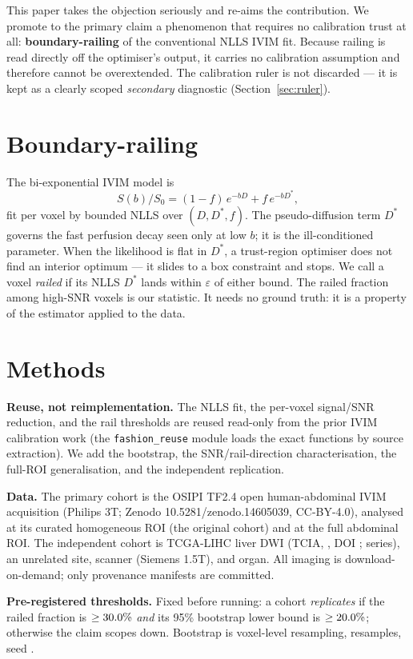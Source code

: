 \documentclass[11pt]{article}
\begin{document}
This paper takes the objection seriously and re-aims the contribution. We promote
to the primary claim a phenomenon that requires no calibration trust at all:
\textbf{boundary-railing} of the conventional NLLS IVIM fit. Because railing is
read directly off the optimiser's output, it carries no calibration assumption and
therefore cannot be overextended. The calibration ruler is not discarded --- it is
kept as a clearly scoped \emph{secondary} diagnostic (Section~\ref{sec:ruler}).

\section{Boundary-railing}
The bi-exponential IVIM model is
\[
S(b)/S_0 = (1-f)\,e^{-bD} + f\,e^{-bD^{*}},
\]
fit per voxel by bounded NLLS over $(D, D^{*}, f)$. The pseudo-diffusion term
$D^{*}$ governs the fast perfusion decay seen only at low $b$; it is the
ill-conditioned parameter. When the likelihood is flat in $D^{*}$, a
trust-region optimiser does not find an interior optimum --- it slides to a box
constraint and stops. We call a voxel \emph{railed} if its NLLS $D^{*}$ lands
within $\varepsilon$ of either bound. The railed fraction among high-SNR voxels is
our statistic. It needs no ground truth: it is a property of the estimator applied
to the data.

\section{Methods}
\textbf{Reuse, not reimplementation.} The NLLS fit, the per-voxel signal/SNR
reduction, and the rail thresholds are reused read-only from the prior IVIM
calibration work (the \texttt{fashion\_reuse} module loads the exact functions by
source extraction). We add the bootstrap, the SNR/rail-direction characterisation,
the full-ROI generalisation, and the independent replication.

\textbf{Data.} The primary cohort is the OSIPI TF2.4 open human-abdominal IVIM
acquisition (Philips 3T; Zenodo 10.5281/zenodo.14605039, CC-BY-4.0), analysed at
its curated homogeneous ROI (the original cohort) and at the full abdominal ROI.
The independent cohort is TCGA-LIHC liver DWI (TCIA, \lihcLicense, DOI
\lihcDOI{}; \lihcNseries{} series), an unrelated site, scanner (Siemens 1.5T), and
organ. All imaging is download-on-demand; only provenance manifests are committed.

\textbf{Pre-registered thresholds.} Fixed before running: a cohort
\emph{replicates} if the railed fraction is $\ge30.0\%$ \emph{and} its 95\%
bootstrap lower bound is $\ge20.0\%$; otherwise the claim scopes down. Bootstrap
is voxel-level resampling, \nboot{} resamples, seed \seed.
\end{document}
